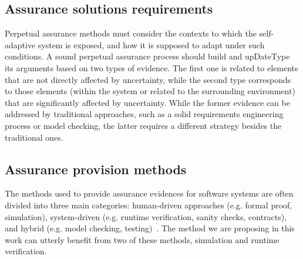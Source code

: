 \subsection{Assurance solutions requirements}

Perpetual assurance methods must consider the contexts to which the self-adaptive system is exposed, and how it is supposed to adapt under such conditions. A sound perpetual assurance process should build and upDateType its arguments based on two types of evidence. The first one is related to elements that are not directly affected by uncertainty, while the second type corresponds to those elements (within the system or related to the surrounding environment) that are significantly affected by uncertainty. While the former evidence can be addressed by traditional approaches, such as a solid requirements engineering process or model checking, the latter requires a different strategy besides the traditional ones.


\subsection{Assurance provision methods}

The methods used to provide assurance evidences for software systems are often divided into three main categories: human-driven approaches (e.g. formal proof, simulation), system-driven (e.g. runtime verification, sanity checks, contracts), and hybrid (e.g. model checking, testing)~\cite{Weyns2016PerpetualAF}. The method we are proposing in this work can utterly benefit from two of these methods, simulation and runtime verification.

